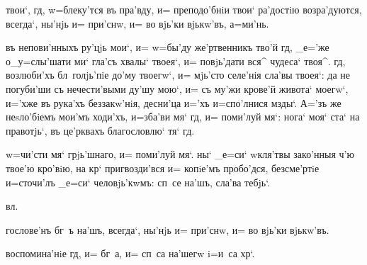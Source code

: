 
 твои`, гд, w=блеку'тся въ пра'вду, и= 
преподо'бнiи твои` ра'достiю возра'дуются, всегда`, 
ны'нjь и= при'снw, и= во вjь'ки вjькw'въ, а=ми'нь.


 въ непови'нныхъ ру'цjь мои`, и= w=бы'ду 
же'ртвенникъ тво'й гд, _е='же о_у=слы'шати ми` гла'съ 
хвалы` твоея`, и= повjь'дати вся^ чудеса` твоя^. гд, 
возлюби'хъ бл~голjь'пiе до'му твоегw`, и= мjь'сто 
селе'нiя сла'вы твоея`: да не погуби'ши съ нечести'выми 
ду'шу мою`, и= съ му'жи крове'й живота` моегw`, и='хже въ 
рука'хъ беззакw'нiя, десни'ца и='хъ и=спо'лнися мзды`. 
А='зъ же неsло'бiемъ мои'мъ ходи'хъ, и=зба'ви мя` гд, 
и= поми'луй мя`: нога` моя` ста` на правотjь`, въ 
це'рквахъ благословлю` тя` гд.



 w=чи'сти мя` грjь'шнаго, и= поми'луй мя`.   ны` _е=си` w\т кля'твы зако'нныя ч'ю 
твое'ю кро'вiю, на кр` пригвозди'вся и= копiе'мъ 
пробо'дся, безсме'ртiе и=сточи'лъ _е=си` человjь'кwмъ: 
сп~се на'шъ, сла'ва тебjь`.


 вл.


го\-сло\-ве'нъ бг~ъ на'шъ, 
всегда`, ны'нjь и= при'снw, и= во вjь'ки вjькw'въ.

 

   
   
   
   
   
   
   
воспомина'нiе гд, и= бг~а, и= сп~са на'шегw i=и~са 
хр`. 

